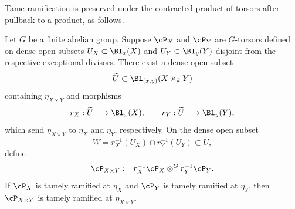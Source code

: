 Tame ramification is preserved under the contracted product of torsors after
pullback to a product, as follows.

\begin{prop}\label{prop:ramification-external-product}
Let $G$ be a finite abelian group. Suppose $\cP_X$ and $\cP_Y$ are
$G$-torsors defined on dense open subsets
$U_X\subset\Bl_x(X)$ and $U_Y\subset\Bl_y(Y)$ disjoint from the respective
exceptional divisors. There exist a dense open subset
\[
    \widetilde U\subset\Bl_{(x,y)}(X\times_kY)
\]
containing $\eta_{X\times Y}$ and morphisms
\[
    r_X:\widetilde U\longrightarrow\Bl_x(X),
    \qquad
    r_Y:\widetilde U\longrightarrow\Bl_y(Y),
\]
which send $\eta_{X\times Y}$ to $\eta_X$ and $\eta_Y$, respectively. On
the dense open subset
\[
    W=r_X^{-1}(U_X)\cap r_Y^{-1}(U_Y)\subset\widetilde U,
\]
define
\[
    \cP_{X\times Y}
      :=r_X^{-1}\cP_X
        \otimes^G
        r_Y^{-1}\cP_Y.
\]
If $\cP_X$ is tamely ramified at $\eta_X$ and $\cP_Y$ is tamely ramified
at $\eta_Y$, then $\cP_{X\times Y}$ is tamely ramified at
$\eta_{X\times Y}$.
\end{prop}

